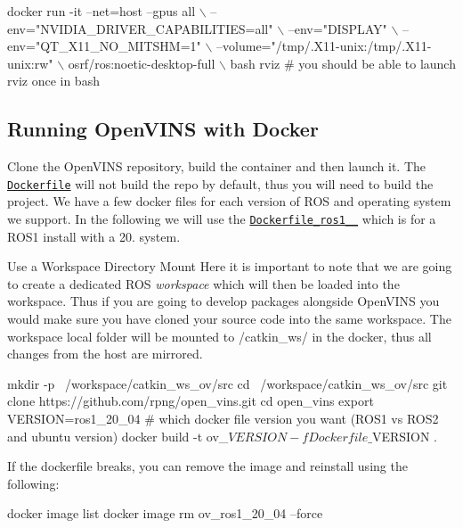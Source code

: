 \begin{DoxyCode}
docker run -it --net=host --gpus all \(\backslash\)
    --env="NVIDIA\_DRIVER\_CAPABILITIES=all" \(\backslash\)
    --env="DISPLAY" \(\backslash\)
    --env="QT\_X11\_NO\_MITSHM=1" \(\backslash\)
    --volume="/tmp/.X11-unix:/tmp/.X11-unix:rw" \(\backslash\)
    osrf/ros:noetic-desktop-full \(\backslash\)
    bash
rviz # you should be able to launch rviz once in bash
\end{DoxyCode}
\hypertarget{dev-docker_dev-docker-openvins}{}\subsection{Running Open\+V\+I\+N\+S with Docker}\label{dev-docker_dev-docker-openvins}
Clone the Open\+V\+I\+NS repository, build the container and then launch it. The \href{https://docs.docker.com/engine/reference/builder/}{\tt Dockerfile} will not build the repo by default, thus you will need to build the project. We have a few docker files for each version of R\+OS and operating system we support. In the following we will use the \href{https://github.com/rpng/open_vins/blob/master/Dockerfile_ros1_20_04}{\tt Dockerfile\+\_\+ros1\+\_\+\_} which is for a R\+O\+S1 install with a 20. system.



\begin{DoxyParagraph}{Use a Workspace Directory Mount}
Here it is important to note that we are going to create a dedicated R\+OS {\itshape workspace} which will then be loaded into the workspace. Thus if you are going to develop packages alongside Open\+V\+I\+NS you would make sure you have cloned your source code into the same workspace. The workspace local folder will be mounted to {\ttfamily /catkin\+\_\+ws/} in the docker, thus all changes from the host are mirrored.
\end{DoxyParagraph}

\begin{DoxyCode}
mkdir -p ~/workspace/catkin\_ws\_ov/src
cd ~/workspace/catkin\_ws\_ov/src
git clone https://github.com/rpng/open\_vins.git
cd open\_vins
export VERSION=ros1\_20\_04 # which docker file version you want (ROS1 vs ROS2 and ubuntu version)
docker build -t ov\_$VERSION -f Dockerfile\_$VERSION .
\end{DoxyCode}


If the dockerfile breaks, you can remove the image and reinstall using the following\+:


\begin{DoxyCode}
docker image list
docker image rm ov\_ros1\_20\_04 --force
\end{DoxyCode}


